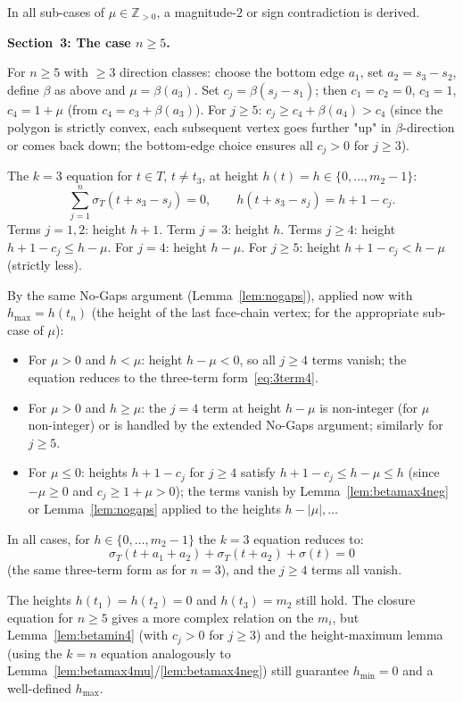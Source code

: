 \documentclass{article}
\begin{document}
In all sub-cases of $\mu\in\mathbb{Z}_{>0}$, a magnitude-$2$ or sign contradiction is derived.

\bigskip
\noindent\textbf{Section~3: The case $n\ge 5$.}

For $n\ge 5$ with $\ge 3$ direction classes: choose the bottom edge $a_1$, set $a_2=s_3-s_2$,
define $\beta$ as above and $\mu=\beta(a_3)$.
Set $c_j=\beta(s_j-s_1)$; then $c_1=c_2=0$, $c_3=1$, $c_4=1+\mu$ (from $c_4=c_3+\beta(a_3)$).
For $j\ge 5$: $c_j\ge c_4+\beta(a_4)>c_4$ (since the polygon is strictly convex,
each subsequent vertex goes further "up" in $\beta$-direction or comes back down;
the bottom-edge choice ensures all $c_j>0$ for $j\ge 3$).

The $k=3$ equation for $t\in T$, $t\ne t_3$, at height $h(t)=h\in\{0,\dots,m_2-1\}$:
\[
  \sum_{j=1}^n \sigma_T(t+s_3-s_j)=0,
  \qquad
  h(t+s_3-s_j)=h+1-c_j.
\]
Terms $j=1,2$: height $h+1$.  Term $j=3$: height $h$.  Terms $j\ge 4$: height $h+1-c_j\le h-\mu$.
For $j=4$: height $h-\mu$.  For $j\ge 5$: height $h+1-c_j<h-\mu$ (strictly less).

By the same No-Gaps argument (Lemma~\ref{lem:nogaps}), applied now with $h_{\max}=h(t_{n})$
(the height of the last face-chain vertex; for the appropriate sub-case of $\mu$):
\begin{itemize}
\item For $\mu>0$ and $h<\mu$: height $h-\mu<0$, so all $j\ge 4$ terms vanish;
  the equation reduces to the three-term form~\eqref{eq:3term4}.
\item For $\mu>0$ and $h\ge\mu$: the $j=4$ term at height $h-\mu$ is non-integer
  (for $\mu$ non-integer) or is handled by the extended No-Gaps argument;
  similarly for $j\ge 5$.
\item For $\mu\le 0$: heights $h+1-c_j$ for $j\ge 4$ satisfy $h+1-c_j\le h-\mu\le h$
  (since $-\mu\ge 0$ and $c_j\ge 1+\mu>0$); the terms vanish by Lemma~\ref{lem:betamax4neg}
  or Lemma~\ref{lem:nogaps} applied to the heights $h-|\mu|,\dots$
\end{itemize}

In all cases, for $h\in\{0,\dots,m_2-1\}$ the $k=3$ equation reduces to:
\[
  \sigma_T(t+a_1+a_2)+\sigma_T(t+a_2)+\sigma(t)=0
\]
(the same three-term form as for $n=3$), and the $j\ge 4$ terms all vanish.

The heights $h(t_1)=h(t_2)=0$ and $h(t_3)=m_2$ still hold.
The closure equation for $n\ge 5$ gives a more complex relation on the $m_i$, but
Lemma~\ref{lem:betamin4} (with $c_j>0$ for $j\ge 3$) and the height-maximum lemma
(using the $k=n$ equation analogously to Lemma~\ref{lem:betamax4mu}/\ref{lem:betamax4neg})
still guarantee $h_{\min}=0$ and a well-defined $h_{\max}$.
\end{document}
